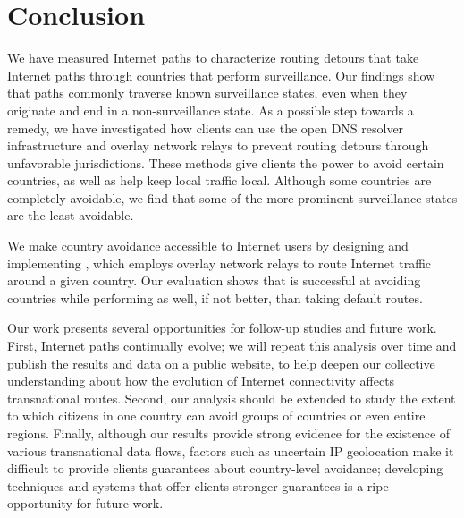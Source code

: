 \section{Conclusion}
\label{conclusion}

We have measured Internet paths to characterize routing
detours that take Internet paths through countries that perform
surveillance.  Our findings show that paths commonly traverse known
surveillance states, even when they originate and end in a
non-surveillance state.  As a possible step towards a remedy, we have
investigated how clients can use the open DNS resolver infrastructure
and overlay network relays to prevent routing detours through
unfavorable jurisdictions.  These methods give clients the power to
avoid certain countries, as well as help keep local traffic local.
Although some countries are completely avoidable, we find that some of
the more prominent surveillance states are the least avoidable.

We make country avoidance accessible to Internet users by designing 
and implementing \system{}, which employs overlay network relays to 
route Internet traffic around a given country.  Our evaluation shows 
that \system{} is successful at avoiding countries while performing 
as well, if not better, than taking default routes.

Our work presents several opportunities for follow-up studies and
future work. First, Internet paths continually
evolve; we will repeat this analysis over time and publish the results
and data on a public website, to help deepen our collective
understanding about how the evolution of Internet connectivity affects
transnational routes. Second, our analysis should be extended to study
the extent to which citizens in one country can avoid groups of
countries or even entire regions. Finally, although our results provide strong 
evidence for the existence of various transnational data flows, factors
such as uncertain IP geolocation make it difficult to provide clients
guarantees about country-level avoidance; developing techniques and
systems that offer clients stronger guarantees
is a ripe opportunity for future work.
